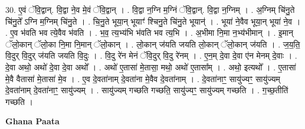 \documentclass[17pt]{extarticle}
\begin{document}
30. ए॒वं ॅवि॒द्वान्. वि॒द्वा ने॒व मे॒वं ॅवि॒द्वान् । . वि॒द्वा न॒ग्नि म॒ग्निं ॅवि॒द्वान्. वि॒द्वा न॒ग्निम् । . अ॒ग्निम् चि॑नु॒ते चि॑नु॒ते᳚ ऽग्नि म॒ग्निम् चि॑नु॒ते । . चि॒नु॒ते भूया॒न् भूयाꣳ॑ श्चिनु॒ते चि॑नु॒ते भूयान्॑ । . भूया॑ ने॒वैव भूया॒न् भूया॑ ने॒व । . ए॒व भ॑वति भव त्ये॒वैव भ॑वति । . भ॒व॒ त्य॒भ्य॑भि भ॑वति भव त्य॒भि । . अ॒भीमा नि॒मा न॒भ्य॑भीमान् । . इ॒मान् ॅलो॒कान् ॅलो॒का नि॒मा नि॒मान् ॅलो॒कान् । . लो॒कान् ज॑यति जयति लो॒कान् ॅलो॒कान् ज॑यति । . ज॒य॒ति॒ वि॒दुर् वि॒दुर् ज॑यति जयति वि॒दुः । . वि॒दु रे॑न मेनं ॅवि॒दुर् वि॒दु रे॑नम् । . ए॒न॒म् दे॒वा दे॒वा ए॑न मेनम् दे॒वाः । . दे॒वा अथो॒ अथो॑ दे॒वा दे॒वा अथो᳚ । . अथो॑ ए॒तासा॑ मे॒तासा॒ मथो॒ अथो॑ ए॒तासा᳚म् । . अथो॒ इत्यथो᳚ । . ए॒तासा॑ मे॒वै वैतासा॑ मे॒तासा॑ मे॒व । . ए॒व दे॒वता॑नाम् दे॒वता॑ना मे॒वैव दे॒वता॑नाम् । . दे॒वता॑नाꣳ॒॒ सायु॑ज्यꣳ॒॒ सायु॑ज्यम् दे॒वता॑नाम् दे॒वता॑नाꣳ॒॒ सायु॑ज्यम् । . सायु॑ज्यम् गच्छति गच्छति॒ सायु॑ज्यꣳ॒॒ सायु॑ज्यम् गच्छति । . ग॒च्छ॒तीति॑ गच्छति । \newline

\textbf{Ghana Paata } \newline
\end{document}

